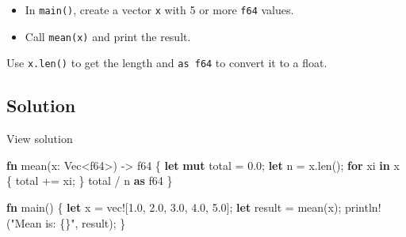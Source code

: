 \documentclass[
  letterpaper,
  DIV=11,
  numbers=noendperiod,
  oneside]{scrreprt}
\newenvironment{Shaded}{\begin{snugshade}}{\end{snugshade}}
\newcommand{\ControlFlowTok}[1]{\textcolor[rgb]{0.00,0.23,0.31}{\textbf{#1}}}
\newcommand{\DataTypeTok}[1]{\textcolor[rgb]{0.68,0.00,0.00}{#1}}
\newcommand{\DecValTok}[1]{\textcolor[rgb]{0.68,0.00,0.00}{#1}}
\newcommand{\KeywordTok}[1]{\textcolor[rgb]{0.00,0.23,0.31}{\textbf{#1}}}
\newcommand{\NormalTok}[1]{\textcolor[rgb]{0.00,0.23,0.31}{#1}}
\newcommand{\OperatorTok}[1]{\textcolor[rgb]{0.37,0.37,0.37}{#1}}
\newcommand{\PreprocessorTok}[1]{\textcolor[rgb]{0.68,0.00,0.00}{#1}}
\newcommand{\StringTok}[1]{\textcolor[rgb]{0.13,0.47,0.30}{#1}}
\providecommand{\tightlist}{%
  \setlength{\itemsep}{0pt}\setlength{\parskip}{0pt}}\usepackage{longtable,booktabs,array}
\begin{document}
\begin{itemize}
\tightlist
\item
  In \texttt{main()}, create a vector \texttt{x} with 5 or more
  \texttt{f64} values.
\item
  Call \texttt{mean(x)} and print the result.
\end{itemize}

\begin{tcolorbox}[enhanced jigsaw, titlerule=0mm, coltitle=black, opacitybacktitle=0.6, bottomrule=.15mm, bottomtitle=1mm, colframe=quarto-callout-note-color-frame, toprule=.15mm, opacityback=0, rightrule=.15mm, leftrule=.75mm, breakable, left=2mm, colback=white, colbacktitle=quarto-callout-note-color!10!white, toptitle=1mm, title=\textcolor{quarto-callout-note-color}{\faInfo}\hspace{0.5em}{Note}, arc=.35mm]

Use \texttt{x.len()} to get the length and \texttt{as\ f64} to convert
it to a float.

\end{tcolorbox}

\subsection{Solution}\label{solution-6}

View solution

\begin{Shaded}
\begin{Highlighting}[]
\KeywordTok{fn}\NormalTok{ mean(x}\OperatorTok{:} \DataTypeTok{Vec}\OperatorTok{\textless{}}\DataTypeTok{f64}\OperatorTok{\textgreater{}}\NormalTok{) }\OperatorTok{{-}\textgreater{}} \DataTypeTok{f64} \OperatorTok{\{}
    \KeywordTok{let} \KeywordTok{mut}\NormalTok{ total }\OperatorTok{=} \DecValTok{0.0}\OperatorTok{;}
    \KeywordTok{let}\NormalTok{ n }\OperatorTok{=}\NormalTok{ x}\OperatorTok{.}\NormalTok{len()}\OperatorTok{;}
    \ControlFlowTok{for}\NormalTok{ xi }\KeywordTok{in}\NormalTok{ x }\OperatorTok{\{}
\NormalTok{        total }\OperatorTok{+=}\NormalTok{ xi}\OperatorTok{;}
    \OperatorTok{\}}
\NormalTok{    total }\OperatorTok{/}\NormalTok{ n }\KeywordTok{as} \DataTypeTok{f64}
\OperatorTok{\}}

\KeywordTok{fn}\NormalTok{ main() }\OperatorTok{\{}
    \KeywordTok{let}\NormalTok{ x }\OperatorTok{=} \PreprocessorTok{vec!}\NormalTok{[}\DecValTok{1.0}\OperatorTok{,} \DecValTok{2.0}\OperatorTok{,} \DecValTok{3.0}\OperatorTok{,} \DecValTok{4.0}\OperatorTok{,} \DecValTok{5.0}\NormalTok{]}\OperatorTok{;}
    \KeywordTok{let}\NormalTok{ result }\OperatorTok{=}\NormalTok{ mean(x)}\OperatorTok{;}
    \PreprocessorTok{println!}\NormalTok{(}\StringTok{"Mean is: \{\}"}\OperatorTok{,}\NormalTok{ result)}\OperatorTok{;}
\OperatorTok{\}}
\end{Highlighting}
\end{Shaded}
\end{document}

